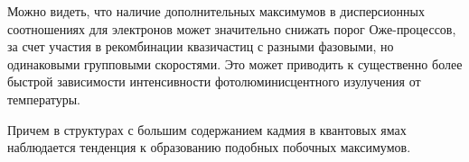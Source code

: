\documentclass[../main.tex]{subfiles}
\begin{document}
        Можно видеть, что наличие дополнительных максимумов в дисперсионных соотношениях для электронов
        может значительно снижать порог Оже-процессов, за счет участия в рекомбинации квазичастиц с разными фазовыми,
        но одинаковыми групповыми скоростями. Это может приводить к существенно более быстрой зависимости
        интенсивности фотолюминисцентного изулучения от температуры.

        Причем в структурах с большим содержанием кадмия в квантовых ямах наблюдается тенденция к образованию
        подобных побочных максимумов. 
    \newpage
\end{document}
